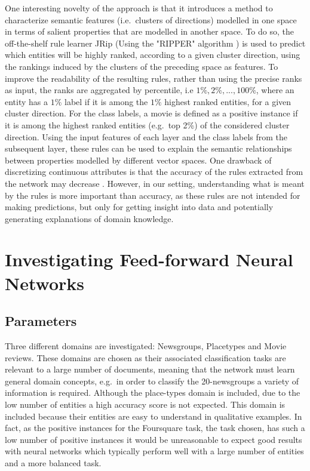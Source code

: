 One interesting  novelty of the approach is that  it introduces a method to characterize semantic features (i.e.\ clusters of directions)  modelled in one space  in terms of salient properties that are modelled in another space. To do so, the off-the-shelf rule learner JRip (Using the "RIPPER" algorithm \cite{Cohen1995})  is used to predict which entities will be highly ranked, according to a given cluster direction, using the rankings induced by the clusters of the preceding space   as features. To improve the readability of the resulting rules, rather than using the precise ranks as input, the ranks are aggregated by percentile, i.e $1\%, 2\%, ..., 100\%$, where an entity has a $1\%$ label if it is among the $1\%$ highest ranked entities, for a given cluster direction. For the class labels,  a movie is defined as a positive instance if it is among the highest ranked entities (e.g.\ top 2\%) of the considered cluster direction. Using the input features of each layer and the class labels  from the subsequent layer, these rules can be used to explain the semantic relationships between properties modelled by different vector spaces. One drawback of discretizing continuous attributes is that the accuracy of the rules extracted from the network may decrease \cite{Setiono2008a}.  However, in our setting, understanding what is meant by the rules is more important than accuracy, as  these rules are not intended for making predictions, but only for getting insight into data and potentially  generating explanations of domain knowledge.


\section{Investigating Feed-forward Neural Networks}\label{ch5:results}

\subsection{Parameters}

Three different domains are investigated: Newsgroups, Placetypes and Movie reviews. These domains are chosen as their  associated classification tasks are relevant to a large number of documents, meaning that the network must learn general domain concepts, e.g.\ in order to classify the 20-newsgroups a variety  of information is required. Although the place-types domain is included, due to the low number of entities a high accuracy score is not expected. This domain is included  because their entities are easy to understand in qualitative examples. In fact, as the positive instances for the Foursquare task, the task chosen, has such a low number of positive instances it would be unreasonable to expect good results with neural networks which typically perform well with a large number of entities and a more balanced task.

